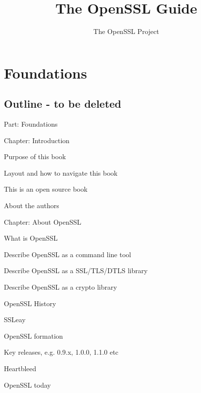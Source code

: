 \documentclass[oneside]{book}
\author{The OpenSSL Project}
\title{The OpenSSL Guide}
\begin{document}
\lstset{style=osslc}
\maketitle
\tableofcontents

\part{Foundations}

\chapter{Outline - to be deleted}

\begin{outline}
  \item{Part: Foundations}
  \begin{outline}
    \item{Chapter: Introduction}
    \begin{outline}
        \item{Purpose of this book}
        \item{Layout and how to navigate this book}
        \item{This is an open source book}
        \item{About the authors}
    \end{outline}
    \item{Chapter: About OpenSSL}
    \begin{outline}
      \item{What is OpenSSL}
      \begin{outline}
        \item{Describe OpenSSL as a command line tool}
        \item{Describe OpenSSL as a SSL/TLS/DTLS library}
        \item{Describe OpenSSL as a crypto library}
      \end{outline}
      \item{OpenSSL History}
      \begin{outline}
        \item{SSLeay}
        \item{OpenSSL formation}
        \item{Key releases, e.g. 0.9.x, 1.0.0, 1.1.0 etc}
        \item{Heartbleed}
        \item{OpenSSL today}
      \end{outline}
    \end{outline}

\end{outline}
\end{outline}
\end{document}
